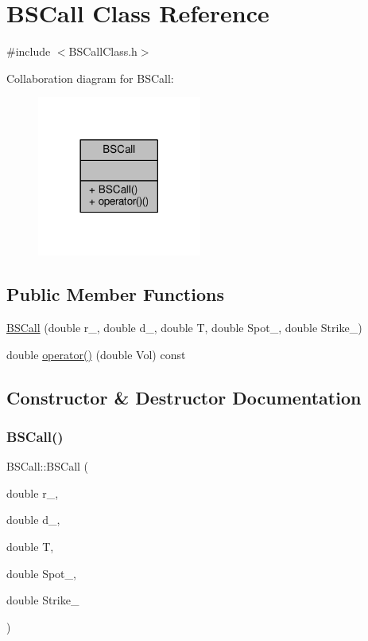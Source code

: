 \hypertarget{classBSCall}{}\section{B\+S\+Call Class Reference}
\label{classBSCall}


{\ttfamily \#include $<$B\+S\+Call\+Class.\+h$>$}



Collaboration diagram for B\+S\+Call\+:
\nopagebreak
\begin{figure}[H]
\begin{center}
\leavevmode
\includegraphics[width=153pt]{classBSCall__coll__graph}
\end{center}
\end{figure}
\subsection*{Public Member Functions}
\begin{DoxyCompactItemize}
\item 
\hyperlink{classBSCall_abe2b43379fddbc8fe0ef9a4173b87608}{B\+S\+Call} (double r\+\_\+, double d\+\_\+, double T, double Spot\+\_\+, double Strike\+\_\+)
\item 
double \hyperlink{classBSCall_a98d2d6613888711c773492520b881e2a}{operator()} (double Vol) const
\end{DoxyCompactItemize}


\subsection{Constructor \& Destructor Documentation}
\hypertarget{classBSCall_abe2b43379fddbc8fe0ef9a4173b87608}{}\label{classBSCall_abe2b43379fddbc8fe0ef9a4173b87608} 
\subsubsection{\texorpdfstring{B\+S\+Call()}{BSCall()}}
{\footnotesize\ttfamily B\+S\+Call\+::\+B\+S\+Call (\begin{DoxyParamCaption}\item[{double}]{r\+\_\+,  }\item[{double}]{d\+\_\+,  }\item[{double}]{T,  }\item[{double}]{Spot\+\_\+,  }\item[{double}]{Strike\+\_\+ }\end{DoxyParamCaption})}



